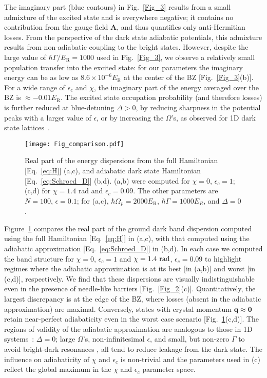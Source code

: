 \documentclass[aps,pra,twocolumn,showpacs,superscriptaddress,floatfix,longbibliography]{revtex4-1}
\def\Er{E_{\mathrm R}}                            			%
\def\Add{{\mathbf A}}
\begin{document}
The imaginary part (blue contours) in Fig.~\ref{Fig_3} results from a small admixture of the excited state and is everywhere negative; it contains no contribution from the gauge field $\Add$, and thus quantifies only anti-Hermitian losses.
From the perspective of the dark state adiabatic potentials, this admixture results from non-adiabatic coupling to the bright states.
However, despite the large value of $\hbar \Gamma/\Er = 1000$ used in Fig.~\ref{Fig_3}, we observe a relatively small population transfer into the excited state: for our parameters the imaginary energy can be as low as $8.6 \times 10^{-6} \Er$ at the center of the BZ [Fig.~\ref{Fig_3}(b)].
For a wide range of $\epsilon_c$ and $\chi$, the imaginary part of the energy averaged over the BZ is $\approx - 0.01 \Er$.
The excited state occupation probability (and therefore losses) is further reduced at blue-detuning $\Delta > 0$, by reducing sharpness in the potential peaks with a larger value of $\epsilon$, or by increasing the $\Omega$'s, as observed for 1D dark state lattices~\cite{Zoller2016, Wang2018, Jendrzejewski2016, Zubairy2020, Gvozdiovas2021, Kubala2021}. 

\begin{figure}[t]
\centering
  \texttt{[image: Fig\_comparison.pdf]}
  \caption{Real part of the energy dispersions from the full Hamiltonian [Eq.~\eqref{eq:H}] (a,c), and adiabatic dark state Hamiltonian [Eq.~\eqref{eq:Schroed_D}] (b,d). 
  (a,b) were computed for $\chi=0$, $\epsilon_c=1$; (c,d) for $\chi=1.4$ rad and $\epsilon_c=0.09$. 
  The other parameters are $N=100$, $\epsilon=0.1$; for (a,c), $\hbar \Omega_p=2000 \Er$, $\hbar \Gamma = 1000 E_R$, and $\Delta=0$.}
  \label{Fig_comparison}
\end{figure}


Figure~\ref{Fig_comparison} compares the real part of the ground dark band dispersion computed using the full Hamiltonian [Eq.~\eqref{eq:H}] in (a,c), with that computed using the adiabatic approximation [Eq.~\eqref{eq:Schroed_D}] in (b,d).
In each case we computed the band structure for $\chi=0$, $\epsilon_c=1$ and $\chi=1.4\ {\rm rad}$, $\epsilon_c=0.09$ to highlight regimes where the adiabatic approximation is at its best [in (a,b)] and worst  [in (c,d)], respectively.
We find that these dispersions are visually indistinguishable even in the presence of needle-like barriers [Fig.~\ref{Fig_2}(c)].
Quantitatively, the largest discrepancy is at the edge of the BZ, where losses (absent in the adiabatic approximation) are maximal.
Conversely, states with crystal momentum $\boldsymbol{q} \approx \mathbf{0}$ retain near-perfect adiabaticity even in the worst case scenario [Fig.~\ref{Fig_comparison}(c,d)].
The regions of validity of the adiabatic approximation are analogous to those in 1D systems~\cite{Wang2018, Jendrzejewski2016, Zubairy2020, Gvozdiovas2021, Kubala2021}: $\Delta=0$; large $\Omega$'s, non-infinitesimal $\epsilon$, and small, but non-zero $\Gamma$ to avoid bright-dark resonances \cite{Zoller2016}, all tend to reduce leakage from the dark state.
The influence on adiabaticity of $\chi$ and $\epsilon_c$ is non-trivial and the parameters used in (c) reflect the global maximum in the $\chi$ and $\epsilon_c$ parameter space.
\end{document}
